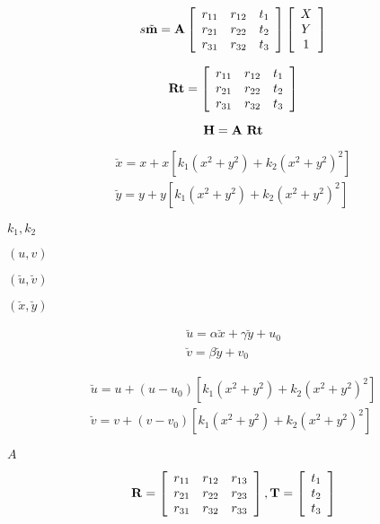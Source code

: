 \documentclass{article}
\begin{document}
{{{\[ s\tilde{\bf{m}} = \bf{A} \left[ \begin{array}{ccc} r_{11} & r_{12} & t_1 \\ r_{21} & r_{22} & t_2 \\ r_{31} & r_{32} & t_3 \end{array} \right] \left[ \begin{array}{c} X\\ Y\\ 1 \end{array} \right] \]
\pagebreak

\[ \bf{Rt} = \left[ \begin{array}{ccc} r_{11} & r_{12} & t_1 \\ r_{21} & r_{22} & t_2 \\ r_{31} & r_{32} & t_3 \end{array} \right] \]
\pagebreak

\[ \bf{H} = \bf{A}\ \bf{Rt} \]
\pagebreak

\[ \begin{array}{l} \breve{x} = x+x[k_1(x^2+y^2)+k_2(x^2+y^2)^2] \\ \breve{y} = y+y[k_1(x^2+y^2)+k_2(x^2+y^2)^2] \end{array} \]
\pagebreak

$ k_1, k_2 $
\pagebreak

$(u, v)$
\pagebreak

$(\breve{u}, \breve{v})$
\pagebreak

$(\breve{x},\breve{y})$
\pagebreak

\[ \begin{array}{l} \breve{u} = \alpha\breve{x}+\gamma\breve{y}+u_0 \\ \breve{v} = \beta\breve{y}+v_0 \end{array} \]
\pagebreak

\[ \begin{array}{l} \breve{u} = u+(u-u_0)[k_1(x^2+y^2)+k_2(x^2+y^2)^2] \\ \breve{v} = v+(v-v_0)[k_1(x^2+y^2)+k_2(x^2+y^2)^2] \end{array} \]
\pagebreak

$A$
\pagebreak

\[ \bf{R} = \left[ \begin{array}{ccc} r_{11} & r_{12} & r_{13}\\ r_{21} & r_{22} & r_{23}\\ r_{31} & r_{32} & r_{33} \end{array} \right], \bf{T} = \left[ \begin{array}{c} t_1 \\ t_2 \\ t_3 \end{array} \right] \]
\pagebreak

}}}
\end{document}
